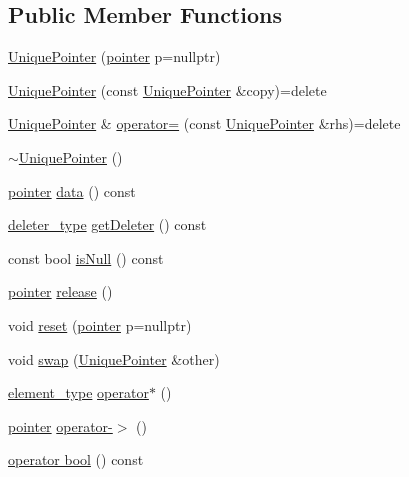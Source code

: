 \subsection*{Public Member Functions}
\begin{DoxyCompactItemize}
\item 
\hyperlink{class_unique_pointer_a9982920bcf97bed211fab425f22bfc34}{Unique\+Pointer} (\hyperlink{class_unique_pointer_a3894408ba9899edc0388aeb018833414}{pointer} p=nullptr)
\item 
\hyperlink{class_unique_pointer_aa8b0142eaf5583737be10113f1560a76}{Unique\+Pointer} (const \hyperlink{class_unique_pointer}{Unique\+Pointer} \&copy)=delete
\item 
\hyperlink{class_unique_pointer}{Unique\+Pointer} \& \hyperlink{class_unique_pointer_a976ee7dcfde743ee180864fef7e330c9}{operator=} (const \hyperlink{class_unique_pointer}{Unique\+Pointer} \&rhs)=delete
\item 
\hyperlink{class_unique_pointer_a34d23b09547c438f3c6c3a57abc50e15}{$\sim$\+Unique\+Pointer} ()
\item 
\hyperlink{class_unique_pointer_a3894408ba9899edc0388aeb018833414}{pointer} \hyperlink{class_unique_pointer_ab07e87f9fcbe6cee2f9f2a0e22ce181e}{data} () const 
\item 
\hyperlink{class_unique_pointer_aea5e9d2fa26d0acca416a9e9451e08c3}{deleter\+\_\+type} \hyperlink{class_unique_pointer_a8e383d41c2499077dca341c6dbe080f9}{get\+Deleter} () const 
\item 
const bool \hyperlink{class_unique_pointer_abce5b65a179dfd63ff572706512aaabb}{is\+Null} () const 
\item 
\hyperlink{class_unique_pointer_a3894408ba9899edc0388aeb018833414}{pointer} \hyperlink{class_unique_pointer_aa2cef6b7af64bf1b83e897ace29a43c7}{release} ()
\item 
void \hyperlink{class_unique_pointer_a03be417a8b93e6655888f812322194b0}{reset} (\hyperlink{class_unique_pointer_a3894408ba9899edc0388aeb018833414}{pointer} p=nullptr)
\item 
void \hyperlink{class_unique_pointer_a1ffb282471b339cbcd7cf3329d3e0af6}{swap} (\hyperlink{class_unique_pointer}{Unique\+Pointer} \&other)
\item 
\hyperlink{class_unique_pointer_a0ccc3b99b9fef0fb9a8d738793535fc2}{element\+\_\+type} \hyperlink{class_unique_pointer_a11af6c570adeb70ac357c2789c5070ab}{operator$\ast$} ()
\item 
\hyperlink{class_unique_pointer_a3894408ba9899edc0388aeb018833414}{pointer} \hyperlink{class_unique_pointer_ae978bbeec35cc36f8298ab083d0f68f4}{operator-\/$>$} ()
\item 
\hyperlink{class_unique_pointer_ace903f0cc5fa47eaf3b65e7dc3cc75e2}{operator bool} () const 
\end{DoxyCompactItemize}


